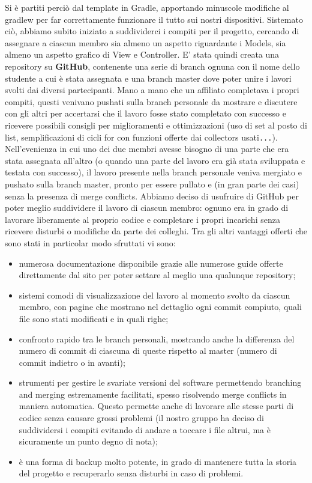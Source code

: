 \documentclass[a4paper,12pt]{report}
\begin{document}
Si è partiti perciò dal template in Gradle, apportando minuscole modifiche al gradlew per far correttamente funzionare il tutto sui nostri dispositivi. Sistemato ciò, abbiamo subito iniziato a suddividerci i compiti per il progetto, cercando di assegnare a ciascun membro  sia almeno un aspetto riguardante i Models, sia almeno un aspetto grafico di View e Controller. E' stata quindi creata una repository su \textbf{GitHub}, contenente una serie di branch ognuna con il nome dello studente a cui è stata assegnata e una branch master dove poter unire i lavori svolti dai diversi partecipanti. Mano a mano che un affiliato completava i propri compiti, questi venivano pushati sulla branch personale da mostrare e discutere con gli altri per accertarsi che il lavoro fosse stato completato con successo e ricevere possibili consigli per miglioramenti e ottimizzazioni (uso di set al posto di list, semplificazioni di cicli for con funzioni offerte dai collectors usati\verb|...|).
Nell'evenienza in cui uno dei due membri avesse bisogno di una parte che era stata assegnata all'altro (o quando una parte del lavoro era già stata sviluppata e testata con successo), il lavoro presente nella branch personale veniva mergiato e pushato sulla branch master, pronto per essere pullato e (in gran parte dei casi) senza la presenza di merge conflicts.
Abbiamo deciso di usufruire di GitHub per poter meglio suddividere il lavoro di ciascun membro: ognuno era in grado di lavorare liberamente al proprio codice e completare i propri incarichi senza ricevere disturbi o modifiche da parte dei colleghi. Tra gli altri vantaggi offerti che sono stati in particolar modo sfruttati vi sono:
\begin{itemize}
    \item numerosa documentazione disponibile grazie alle numerose guide offerte direttamente dal sito per poter settare al meglio una qualunque repository;
    \item sistemi comodi di visualizzazione del lavoro al momento svolto da ciascun membro, con pagine che mostrano nel dettaglio ogni commit compiuto, quali file sono stati modificati e in quali righe;
    \item confronto rapido tra le branch personali, mostrando anche la differenza del numero di commit di ciascuna di queste rispetto al master (numero di commit indietro o in avanti);
    \item strumenti per gestire le svariate versioni del software permettendo branching and merging estremamente facilitati, spesso risolvendo merge conflicts in maniera automatica. Questo permette anche di lavorare alle stesse parti di codice senza causare grossi problemi (il nostro gruppo ha deciso di suddividersi i compiti evitando di andare a toccare i file altrui, ma è sicuramente un punto degno di nota);
    \item è una forma di backup molto potente, in grado di mantenere tutta la storia del progetto e recuperarlo senza disturbi in caso di problemi.
\end{itemize}
\end{document}
